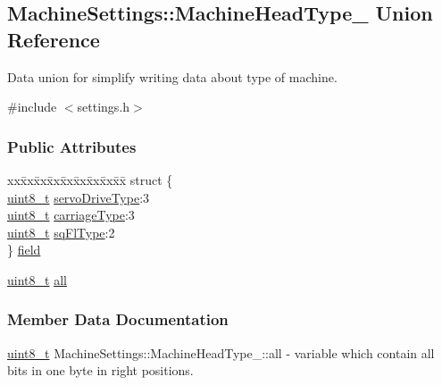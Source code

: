 \hypertarget{unionMachineSettings_1_1MachineHeadType__}{}\subsection{Machine\+Settings\+:\+:Machine\+Head\+Type\+\_\+ Union Reference}
\label{unionMachineSettings_1_1MachineHeadType__}
Data union for simplify writing data about type of machine.

{\ttfamily \#include $<$settings.\+h$>$}

\subsubsection*{Public Attributes}
\begin{DoxyCompactItemize}
\item 
\begin{tabbing}
xx\=xx\=xx\=xx\=xx\=xx\=xx\=xx\=xx\=\kill
struct \{\\
\>\mbox{\hyperlink{settings_8h_a48091a1e52849b0871df2f7081be2e38}{uint8\_t}} \mbox{\hyperlink{unionMachineSettings_1_1MachineHeadType___afc80a5ddb9d3c32acc2806e3d40b3cac}{servoDriveType}}:3\\
\>\mbox{\hyperlink{settings_8h_a48091a1e52849b0871df2f7081be2e38}{uint8\_t}} \mbox{\hyperlink{unionMachineSettings_1_1MachineHeadType___aa0f8d784533ff6745ba4834918dcd1d0}{carriageType}}:3\\
\>\mbox{\hyperlink{settings_8h_a48091a1e52849b0871df2f7081be2e38}{uint8\_t}} \mbox{\hyperlink{unionMachineSettings_1_1MachineHeadType___a8830b714224e8dcdffe934025ee8b492}{sqFlType}}:2\\
\} \mbox{\hyperlink{unionMachineSettings_1_1MachineHeadType___a3a42ea7e1b8c9424380b826d5156313c}{field}}\\

\end{tabbing}\item 
\mbox{\hyperlink{settings_8h_a48091a1e52849b0871df2f7081be2e38}{uint8\+\_\+t}} \mbox{\hyperlink{unionMachineSettings_1_1MachineHeadType___a739b2ca21cd71e4d27968b8c5168dae7}{all}}
\end{DoxyCompactItemize}


\subsubsection{Member Data Documentation}
\mbox{\label{unionMachineSettings_1_1MachineHeadType___a739b2ca21cd71e4d27968b8c5168dae7}} 
{\footnotesize\ttfamily \mbox{\hyperlink{settings_8h_a48091a1e52849b0871df2f7081be2e38}{uint8\+\_\+t}} Machine\+Settings\+::\+Machine\+Head\+Type\+\_\+\+::\texorpdfstring{all}{all}} - variable which contain all bits in one byte in right positions.


